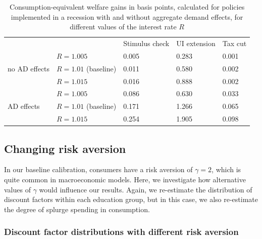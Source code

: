 \documentclass[\econtexRoot/HAFiscal]{subfiles}
\begin{document}
\begin{table}[]
  \begin{center}
    \begin{tabular}{@{}lllll@{}}
      \toprule
      &                    & Stimulus check & UI extension & Tax cut \\ \cmidrule(l){1-5} 
      \multirow{3}{*}{no AD effects}            	& $R = 1.005$ 			& 0.005        & 0.283       & 0.001	\\
      & $R = 1.01$ (baseline) & 0.011        & 0.580       & 0.002   	\\
      & $R = 1.015$ 			& 0.016        & 0.888       & 0.002   	\\ \cmidrule(l){1-5}
      \multirow{3}{*}{AD effects}					& $R = 1.005$    		& 0.086        & 0.630       & 0.033  	\\		
      & $R = 1.01$ (baseline) & 0.171        & 1.266       & 0.065   	\\
      & $R = 1.015$    		& 0.254        & 1.905       & 0.098    \\ \cmidrule(l){1-5} 
    \end{tabular}
    \caption{Consumption-equivalent welfare gains in basis points, calculated for policies implemented in a recession with and without aggregate demand effects, for different values of the interest rate $R$}
    \notinsubfile{\label{tab:robustness_R_results}}
  \end{center}
\end{table}


\FloatBarrier
\subsection{Changing risk aversion} 
\notinsubfile{\label{sec:robust_gamma}} 

In our baseline calibration, consumers have a risk aversion of $\gamma=2$, which is quite common in macroeconomic models. Here, we investigate how alternative values of $\gamma$ would influence our results. Again, we re-estimate the distribution of discount factors within each education group, but in this case, we also re-estimate the degree of splurge spending in consumption. 

\subsubsection{Discount factor distributions with different risk aversion}
\notinsubfile{\label{sec:robust_gamma_estim}}
\end{document}
